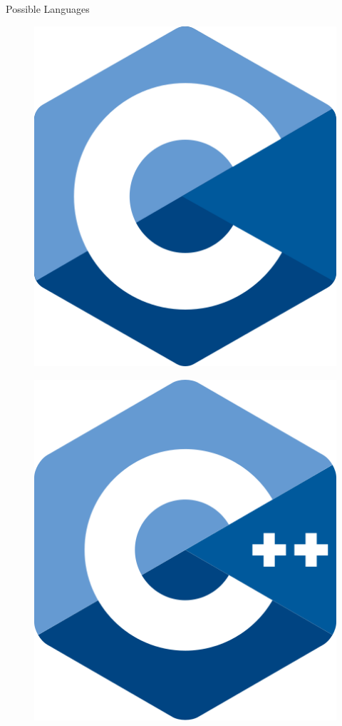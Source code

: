 \documentclass[mathserif,table]{gkibeamer-aaai}
\begin{document}
\begin{frame}{Possible Languages}
	\begin{multicols}{2}
		\begin{figure}[ht]
			\includegraphics[scale=0.3]{./figures/c_logo.png}
		\end{figure}
		\columnbreak
		\begin{figure}[ht]
			\includegraphics[scale=0.2]{./figures/cpp_logo.png}
		\end{figure}
	\end{multicols}
\end{frame}
\end{document}
